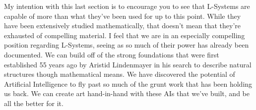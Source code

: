 \documentclass[12pt,twoside]{reedthesis}
\begin{document}
	My intention with this last section is to encourage you to see that L-Systems are capable of more than what they've been used for up to this point. While they have been extensively studied mathematically, that doesn't mean that they're exhausted of compelling material. I feel that we are in an especially compelling position regarding L-Systems, seeing as so much of their power has already been documented. We can build off of the strong foundations that were first established 55 years ago by Aristid Lindenmayer in his search to describe natural structures though mathematical means. We have discovered the potential of Artificial Intelligence to fly past so much of the grunt work that has been holding us back. We can create art hand-in-hand with these AIs that we've built, and be all the better for it.
	


%
%
\end{document}

